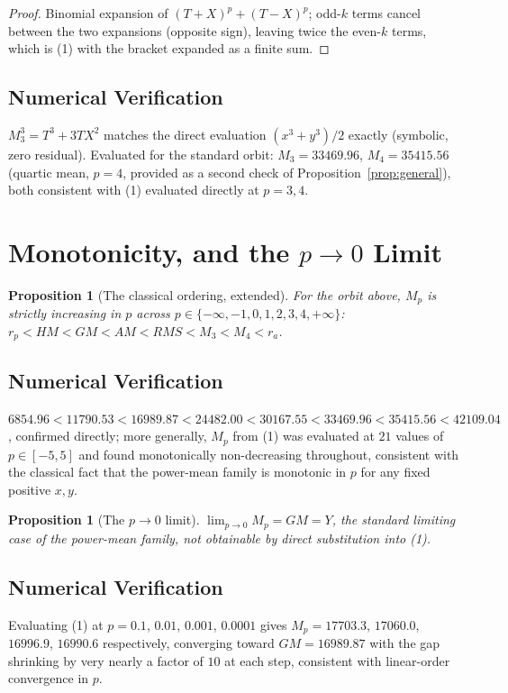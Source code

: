 \documentclass[12pt]{amsart}
\theoremstyle{plain}
\newtheorem{proposition}[theorem]{Proposition}
\theoremstyle{remark}
\begin{document}
\begin{proof}
Binomial expansion of $(T+X)^p+(T-X)^p$; odd-$k$ terms cancel between the two expansions (opposite sign), leaving twice the even-$k$ terms, which is (1) with the bracket expanded as a finite sum.
\end{proof}

\subsection*{Numerical Verification}
$M_3^3=T^3+3TX^2$ matches the direct evaluation $(x^3+y^3)/2$ exactly (symbolic, zero residual). Evaluated for the standard orbit: $M_3=33469.96$, $M_4=35415.56$ (quartic mean, $p=4$, provided as a second check of Proposition~\ref{prop:general}), both consistent with (1) evaluated directly at $p=3,4$.

\section{Monotonicity, and the $p\to0$ Limit}

\begin{proposition}[The classical ordering, extended]\label{prop:order}
For the orbit above, $M_p$ is strictly increasing in $p$ across $p\in\{-\infty,-1,0,1,2,3,4,+\infty\}$: $r_p<HM<GM<AM<RMS<M_3<M_4<r_a$.
\end{proposition}

\subsection*{Numerical Verification}
$6854.96<11790.53<16989.87<24482.00<30167.55<33469.96<35415.56<42109.04$, confirmed directly; more generally, $M_p$ from (1) was evaluated at $21$ values of $p\in[-5,5]$ and found monotonically non-decreasing throughout, consistent with the classical fact that the power-mean family is monotonic in $p$ for any fixed positive $x,y$.

\begin{proposition}[The $p\to0$ limit]\label{prop:limit}
$\lim_{p\to0}M_p=GM=Y$, the standard limiting case of the power-mean family, not obtainable by direct substitution into (1).
\end{proposition}

\subsection*{Numerical Verification}
Evaluating (1) at $p=0.1$, $0.01$, $0.001$, $0.0001$ gives
$M_p=17703.3$, $17060.0$, $16996.9$, $16990.6$ respectively,
converging toward $GM=16989.87$ with the gap shrinking by very nearly a factor of $10$ at each step, consistent with linear-order convergence in $p$.
\end{document}
